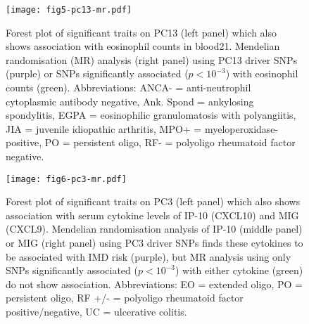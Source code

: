 \documentclass[11pt]{article}
\begin{document}
\begin{figure}
  \centering
  \texttt{[image: fig5-pc13-mr.pdf]}
  \caption{Forest plot of significant traits on PC13 (left panel) which also shows association with eosinophil counts in blood21. Mendelian randomisation (MR) analysis (right panel) using PC13 driver SNPs (purple) or SNPs significantly associated ($p<10^{-3}$) with eosinophil counts (green).  Abbreviations: ANCA- = anti-neutrophil cytoplasmic antibody negative, Ank. Spond = ankylosing spondylitis, EGPA = eosinophilic granulomatosis with polyangiitis, JIA = juvenile idiopathic arthritis, MPO+ = myeloperoxidase-positive, PO = persistent oligo, RF- = polyoligo rheumatoid factor negative.}
  \label{fig:4}
\end{figure}

\begin{figure}
  \centering
  \texttt{[image: fig6-pc3-mr.pdf]}
  \caption{Forest plot of significant traits on PC3 (left panel) which also shows association with serum cytokine levels of IP-10 (CXCL10) and MIG (CXCL9). Mendelian randomisation analysis of IP-10 (middle panel) or MIG (right panel) using PC3 driver SNPs finds these cytokines to be associated with IMD risk (purple), but MR analysis using only SNPs significantly associated ($p<10^{-3}$) with either cytokine (green) do not show association. Abbreviations: EO = extended oligo, PO = persistent oligo,  RF +/- = polyoligo rheumatoid factor positive/negative, UC = ulcerative colitis.}
  \label{fig:4}
\end{figure}
\end{document}
